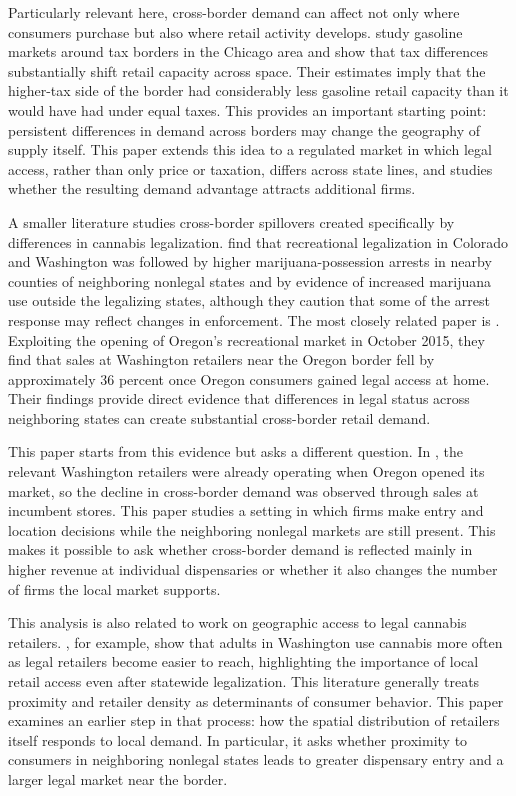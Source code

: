 \documentclass[english,12pt]{article}
\begin{document}
Particularly relevant here, cross-border demand can affect not only where consumers purchase but also where retail activity develops. \cite{ManuszakMoul2009} study gasoline markets around tax borders in the Chicago area and show that tax differences substantially shift retail capacity across space. Their estimates imply that the higher-tax side of the border had considerably less gasoline retail capacity than it would have had under equal taxes. This provides an important starting point: persistent differences in demand across borders may change the geography of supply itself. This paper extends this idea to a regulated market in which legal access, rather than only price or taxation, differs across state lines, and studies whether the resulting demand advantage attracts additional firms.

A smaller literature studies cross-border spillovers created specifically by differences in cannabis legalization. \cite{HaoCowan2020} find that recreational legalization in Colorado and Washington was followed by higher marijuana-possession arrests in nearby counties of neighboring nonlegal states and by evidence of increased marijuana use outside the legalizing states, although they caution that some of the arrest response may reflect changes in enforcement. The most closely related paper is \cite{HansenMillerWeber2020}. Exploiting the opening of Oregon's recreational market in October 2015, they find that sales at Washington retailers near the Oregon border fell by approximately 36 percent once Oregon consumers gained legal access at home. Their findings provide direct evidence that differences in legal status across neighboring states can create substantial cross-border retail demand.

This paper starts from this evidence but asks a different question. In \cite{HansenMillerWeber2020}, the relevant Washington retailers were already operating when Oregon opened its market, so the decline in cross-border demand was observed through sales at incumbent stores. This paper studies a setting in which firms make entry and location decisions while the neighboring nonlegal markets are still present. This makes it possible to ask whether cross-border demand is reflected mainly in higher revenue at individual dispensaries or whether it also changes the number of firms the local market supports.

This analysis is also related to work on geographic access to legal cannabis retailers. \cite{AmbroseCowanRosenman2021}, for example, show that adults in Washington use cannabis more often as legal retailers become easier to reach, highlighting the importance of local retail access even after statewide legalization. This literature generally treats proximity and retailer density as determinants of consumer behavior. This paper examines an earlier step in that process: how the spatial distribution of retailers itself responds to local demand. In particular, it asks whether proximity to consumers in neighboring nonlegal states leads to greater dispensary entry and a larger legal market near the border.
\end{document}
